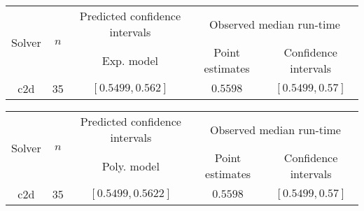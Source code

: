 \begin{tabular}{ccccc}
\hline 
\multirow{2}{*}{Solver} & \multirow{2}{*}{$n$} & Predicted confidence intervals & \multicolumn{2}{c}{Observed median  run-time}\tabularnewline
 &  & Exp. model  & Point estimates  & Confidence intervals\tabularnewline
\hline 
\hline 
\multirow{0}{*}{c2d} & 35 & $\mathbf{\left[0.5499,0.562\right]}$ & $0.5598$ & $\left[0.5499,0.57\right]$ \tabularnewline 
\hline 
\end{tabular} 

\begin{tabular}{ccccc}
\hline 
\multirow{2}{*}{Solver} & \multirow{2}{*}{$n$} & Predicted confidence intervals & \multicolumn{2}{c}{Observed median  run-time}\tabularnewline
 &  & Poly. model  & Point estimates  & Confidence intervals\tabularnewline
\hline 
\hline 
\multirow{0}{*}{c2d} & 35 & $\mathbf{\left[0.5499,0.5622\right]}$ & $0.5598$ & $\left[0.5499,0.57\right]$ \tabularnewline 
\hline 
\end{tabular} 


